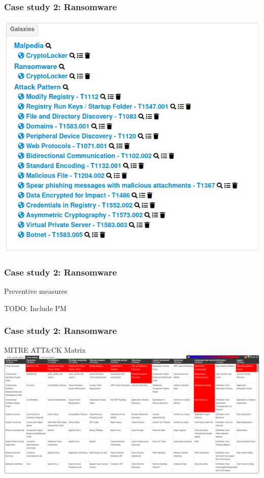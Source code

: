 \begin{frame}
    \frametitle{Case study 2: Ransomware}
    \begin{center}
        \includegraphics[width=0.80\linewidth]{pictures/case2/event-clusters.png}
    \end{center}
\end{frame}

\begin{frame}
    \frametitle{Case study 2: Ransomware}
    Preventive measures
    \begin{center}
        TODO: Include PM
    \end{center}
\end{frame}

\begin{frame}
    \frametitle{Case study 2: Ransomware}
    MITRE ATT\&CK Matrix\\

    \vspace{1cm}
    \includegraphics[width=1.0\linewidth]{pictures/case2/event-attack.png}
\end{frame}

